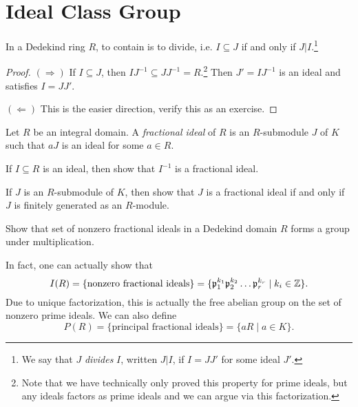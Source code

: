 \section{Ideal Class Group}

\begin{prop}
  In a Dedekind ring $R$, to contain is to divide,
  i.e. $I \subseteq J$ if and only if $J | I$.\footnote{We say that $J$ \emph{divides} $I$, written $J | I$, if $I = J J'$ for some ideal $J'$.}
\end{prop}

\begin{proof}
  $(\Rightarrow)$ If $I \subseteq J$, then
  $I J^{-1} \subseteq J J^{-1} = R$.\footnote{Note that we have technically only proved this property for prime ideals, but any ideals factors as prime ideals and we can argue via this factorization.} Then $J' = IJ^{-1}$
  is an ideal and satisfies $I = J J'$.

  $(\Leftarrow)$ This is the easier direction, verify
  this as an exercise.
\end{proof}

\begin{definition}
  Let $R$ be an integral domain.
  A \emph{fractional ideal} of $R$ is an $R$-submodule
  $J$ of $K$ such that $aJ$ is an ideal for some
  $a \in R$.
\end{definition}

\begin{exercise}
  If $I \subseteq R$ is an ideal, then show that
  $I^{-1}$ is a fractional ideal.
\end{exercise}

\begin{exercise}
  If $J$ is an $R$-submodule of $K$, then show that
  $J$ is a fractional ideal if and only if $J$ is
  finitely generated as an $R$-module.
\end{exercise}

\begin{exercise}
  Show that set of nonzero fractional ideals in a
  Dedekind domain $R$ forms a group under multiplication.
\end{exercise}

\begin{remark}
  In fact, one can actually show that
  \[
    I(R) = \{\text{nonzero fractional ideals}\}
    = \{\mathfrak{p}_1^{k_1} \mathfrak{p}_2^{k_2} \dots \mathfrak{p}_r^{k_r} \mid k_i \in \mathbb{Z}\}.
  \]
  Due to unique factorization, this is actually the
  free abelian group on the set of nonzero prime ideals.
  We can also define
  \[
    P(R) = \{\text{principal fractional ideals}\}
    = \{aR \mid a \in K\}.
  \]
\end{remark}

